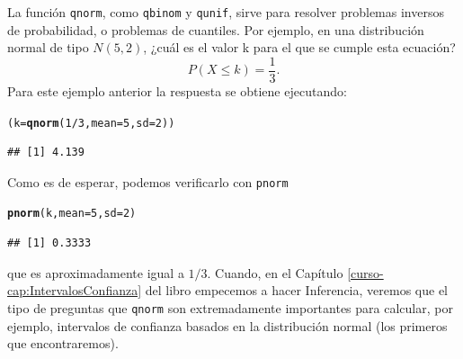 \documentclass[10pt,a4paper]{article}\usepackage[]{graphicx}\usepackage[]{color}
\makeatletter
\newcommand{\hlnum}[1]{\textcolor[rgb]{0.686,0.059,0.569}{#1}}%
\newcommand{\hlopt}[1]{\textcolor[rgb]{0,0,0}{#1}}%
\newcommand{\hlstd}[1]{\textcolor[rgb]{0.345,0.345,0.345}{#1}}%
\newcommand{\hlkwb}[1]{\textcolor[rgb]{0.69,0.353,0.396}{#1}}%
\newcommand{\hlkwc}[1]{\textcolor[rgb]{0.333,0.667,0.333}{#1}}%
\newcommand{\hlkwd}[1]{\textcolor[rgb]{0.737,0.353,0.396}{\textbf{#1}}}%
\newenvironment{kframe}{%
 \def\at@end@of@kframe{}%
 \ifinner\ifhmode%
  \def\at@end@of@kframe{\end{minipage}}%
  \begin{minipage}{\columnwidth}%
 \fi\fi%
 \def\FrameCommand##1{\hskip\@totalleftmargin \hskip-\fboxsep
 \colorbox{shadecolor}{##1}\hskip-\fboxsep
     \hskip-\linewidth \hskip-\@totalleftmargin \hskip\columnwidth}%
 \MakeFramed {\advance\hsize-\width
   \@totalleftmargin\z@ \linewidth\hsize
   \@setminipage}}%
 {\par\unskip\endMakeFramed%
 \at@end@of@kframe}
\newenvironment{knitrout}{}{} %
\newcounter{cont01}
\makeatother
\begin{document}
La función {\tt qnorm}, como {\tt qbinom} y {\tt qunif}, sirve para resolver problemas inversos de probabilidad, o problemas de cuantiles. Por ejemplo,  en una distribución normal de tipo $N(5,2)$, ¿cuál es el valor k para el que se cumple esta ecuación?
\[
P(X\leq k) = \dfrac{1}{3}.
\]
Para este ejemplo anterior la respuesta se obtiene ejecutando:
\begin{knitrout}
\color{fgcolor}\begin{kframe}
\begin{alltt}
    \hlstd{(k} \hlkwb{=} \hlkwd{qnorm}\hlstd{(}\hlnum{1}\hlopt{/}\hlnum{3}\hlstd{,} \hlkwc{mean}\hlstd{=}\hlnum{5}\hlstd{,} \hlkwc{sd}\hlstd{=}\hlnum{2}\hlstd{))}
\end{alltt}
\begin{verbatim}
## [1] 4.139
\end{verbatim}
\end{kframe}
\end{knitrout}
Como es de esperar, podemos verificarlo con {\tt pnorm}
\begin{knitrout}
\color{fgcolor}\begin{kframe}
\begin{alltt}
\hlkwd{pnorm}\hlstd{(k,} \hlkwc{mean}\hlstd{=}\hlnum{5}\hlstd{,} \hlkwc{sd}\hlstd{=}\hlnum{2}\hlstd{)}
\end{alltt}
\begin{verbatim}
## [1] 0.3333
\end{verbatim}
\end{kframe}
\end{knitrout}
que es aproximadamente igual a $1/3$. Cuando, en el Capítulo \ref{curso-cap:IntervalosConfianza} del libro empecemos a hacer Inferencia, veremos que el tipo de preguntas que {\tt qnorm} son extremadamente importantes para calcular, por ejemplo, intervalos de confianza basados en la distribución normal (los primeros que encontraremos).
\end{document}
